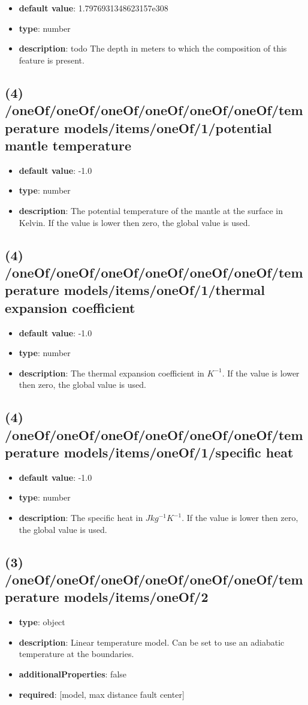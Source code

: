 \begin{itemize}[leftmargin=4em]\item {\bf default value}: 1.7976931348623157e308
\item {\bf type}: number
\item {\bf description}: todo The depth in meters to which the composition of this feature is present.
\end{itemize}\subsection{(4) /oneOf/oneOf/oneOf/oneOf/oneOf/oneOf/temperature models/items/oneOf/1/potential mantle temperature}
\begin{itemize}[leftmargin=4em]\item {\bf default value}: -1.0
\item {\bf type}: number
\item {\bf description}: The potential temperature of the mantle at the surface in Kelvin. If the value is lower then zero, the global value is used.
\end{itemize}\subsection{(4) /oneOf/oneOf/oneOf/oneOf/oneOf/oneOf/temperature models/items/oneOf/1/thermal expansion coefficient}
\begin{itemize}[leftmargin=4em]\item {\bf default value}: -1.0
\item {\bf type}: number
\item {\bf description}: The thermal expansion coefficient in $K^{-1}$. If the value is lower then zero, the global value is used.
\end{itemize}\subsection{(4) /oneOf/oneOf/oneOf/oneOf/oneOf/oneOf/temperature models/items/oneOf/1/specific heat}
\begin{itemize}[leftmargin=4em]\item {\bf default value}: -1.0
\item {\bf type}: number
\item {\bf description}: The specific heat in $J kg^{-1} K^{-1}$. If the value is lower then zero, the global value is used.
\end{itemize}\subsection{(3) /oneOf/oneOf/oneOf/oneOf/oneOf/oneOf/temperature models/items/oneOf/2}
\begin{itemize}[leftmargin=3em]\item {\bf type}: object
\item {\bf description}: Linear temperature model. Can be set to use an adiabatic temperature at the boundaries.
\item {\bf additionalProperties}: false
\item {\bf required}: [model, max distance fault center]\end{itemize}
